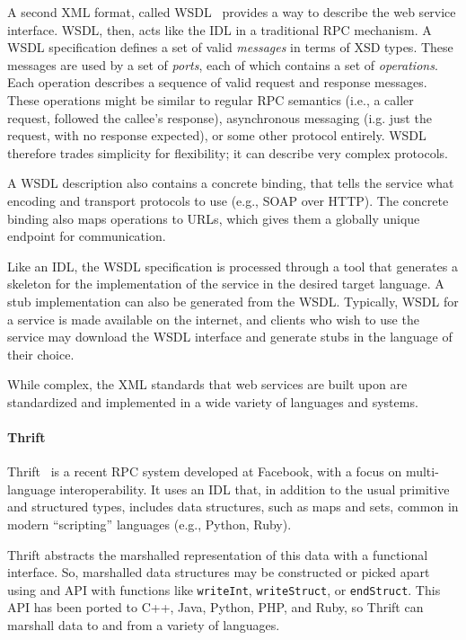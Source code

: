 A second XML format, called WSDL~\cite{curbera02soap} provides a way to describe the web service interface. WSDL, then, acts like the IDL in a traditional RPC mechanism. A WSDL specification defines a set of valid \emph{messages} in terms of XSD types. These messages are used by a set of \emph{ports}, each of which contains a set of \emph{operations}. Each operation describes a sequence of valid request and response messages. These operations might be similar to regular RPC semantics (i.e., a caller request, followed the callee's response), asynchronous messaging (i.g. just the request, with no response expected), or some other protocol entirely. WSDL therefore trades simplicity for flexibility; it can describe very complex protocols.

A WSDL description also contains a concrete binding, that tells the service what encoding and transport protocols to use (e.g., SOAP over HTTP). The concrete binding also maps operations to URLs, which gives them a globally unique endpoint for communication.

Like an IDL, the WSDL specification is processed through a tool that generates a skeleton for the implementation of the service in the desired target language. A stub implementation can also be generated from the WSDL. Typically, WSDL for a service is made available on the internet, and clients who wish to use the service may download the WSDL interface and generate stubs in the language of their choice.

While complex, the XML standards that web services are built upon are standardized and implemented in a wide variety of languages and systems.

\paragraph{Thrift}

Thrift~\cite{slee07thrift} is a recent RPC system developed at Facebook, with a focus on multi-language interoperability. It uses an IDL that, in addition to the usual primitive and structured types, includes data structures, such as maps and sets, common in modern ``scripting'' languages (e.g., Python, Ruby).

Thrift abstracts the marshalled representation of this data with a functional interface. So, marshalled data structures may be constructed or picked apart using and API with functions like \texttt{writeInt}, \texttt{writeStruct}, or \texttt{endStruct}. This API has been ported to C++, Java, Python, PHP, and Ruby, so Thrift can marshall data to and from a variety of languages.

